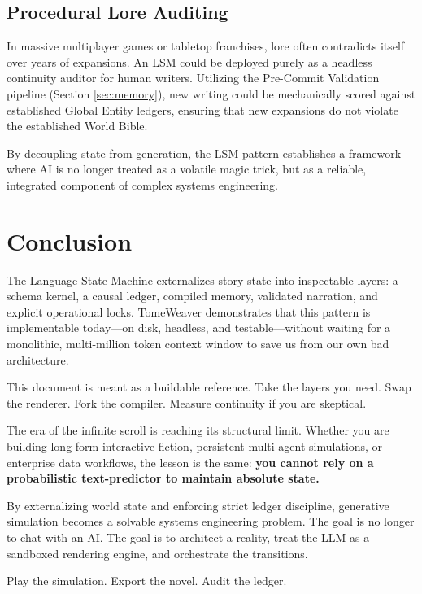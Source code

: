 \documentclass[12pt, a4paper]{article}
\begin{document}
\subsection{Procedural Lore Auditing}
In massive multiplayer games or tabletop franchises, lore often contradicts itself over years of expansions. An LSM could be deployed purely as a headless continuity auditor for human writers. Utilizing the Pre-Commit Validation pipeline (Section \ref{sec:memory}), new writing could be mechanically scored against established Global Entity ledgers, ensuring that new expansions do not violate the established World Bible.

By decoupling state from generation, the LSM pattern establishes a framework where AI is no longer treated as a volatile magic trick, but as a reliable, integrated component of complex systems engineering.




\section{Conclusion}

The Language State Machine externalizes story state into inspectable layers: a schema kernel, a causal ledger, compiled memory, validated narration, and explicit operational locks. TomeWeaver demonstrates that this pattern is implementable today---on disk, headless, and testable---without waiting for a monolithic, multi-million token context window to save us from our own bad architecture. 

This document is meant as a buildable reference. Take the layers you need. Swap the renderer. Fork the compiler. Measure continuity if you are skeptical.

The era of the infinite scroll is reaching its structural limit. Whether you are building long-form interactive fiction, persistent multi-agent simulations, or enterprise data workflows, the lesson is the same: \textbf{you cannot rely on a probabilistic text-predictor to maintain absolute state.}

By externalizing world state and enforcing strict ledger discipline, generative simulation becomes a solvable systems engineering problem. The goal is no longer to chat with an AI. The goal is to architect a reality, treat the LLM as a sandboxed rendering engine, and orchestrate the transitions.

Play the simulation. Export the novel. Audit the ledger.
\end{document}
